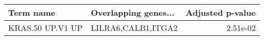 \begin{tabular}{llr}
\toprule
       Term name & Overlapping genes... &  Adjusted p-value \\
\midrule
KRAS.50 UP.V1 UP &   LILRA6,CALB1,ITGA2 &          2.51e-02 \\
\bottomrule
\end{tabular}
